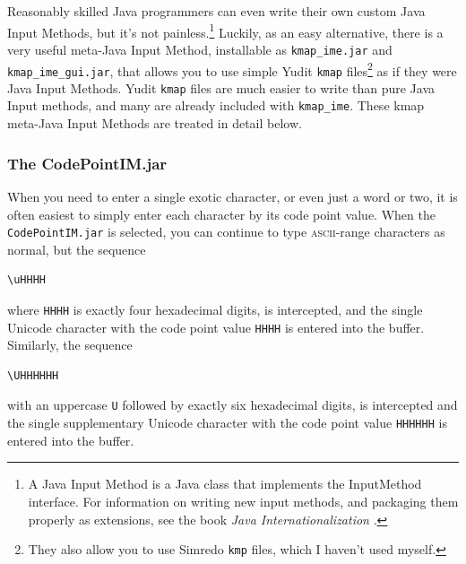 \documentclass[letterpaper,12pt]{article}
\newcommand{\acro}{\textsc}
\begin{document}



Reasonably skilled Java programmers can even write their own custom Java
Input Methods, but it's not painless.\footnote{A Java Input Method is a
Java class that implements the InputMethod interface.  For information on
writing new input methods, and packaging them properly as extensions, see
the book \emph{Java Internationalization}
\cite{deitsch+czarnecki:2001}.} Luckily, as an easy alternative, there is a very useful
meta-Java Input Method, installable as \texttt{kmap\_ime.jar} and
\texttt{kmap\_ime\_gui.jar}, that allows you to use simple Yudit
\texttt{kmap} files\footnote{They also allow you to use Simredo
\texttt{kmp} files, which I haven't used myself.} as if they were Java
Input Methods.  Yudit \texttt{kmap} files are much easier to write than
pure Java Input methods, and many are already included with
\texttt{kmap\_ime}.  These kmap meta-Java Input Methods are treated in
detail below.


\subsubsection{The CodePointIM.jar}

When you need to enter a single exotic character, or even just a word or
two, it is often easiest to simply enter each character by its code point
value.  When the \texttt{CodePointIM.jar} is selected, you can continue
to type \acro{ascii}-range characters as normal, but the sequence 

\begin{Verbatim}[fontsize=\small]
\uHHHH
\end{Verbatim}

\noindent
where
\texttt{HHHH} is exactly four hexadecimal digits, is intercepted,
and the single Unicode character with the code point
value \texttt{HHHH} is entered into the buffer.  Similarly, the sequence 

\begin{Verbatim}[fontsize=\small]
\UHHHHHH
\end{Verbatim}

\noindent
with an uppercase \texttt{U} followed by exactly six hexadecimal digits,
is intercepted and the single supplementary Unicode character with the
code point value \texttt{HHHHHH} is entered into the buffer.
\end{document}
